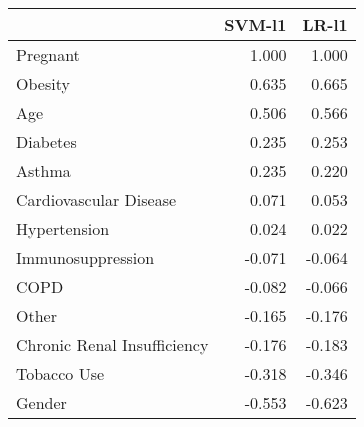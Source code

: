 \begin{tabular}{lrr}
\toprule
{} &  SVM-l1 &  LR-l1 \\
\midrule
Pregnant                    &   1.000 &  1.000 \\
Obesity                     &   0.635 &  0.665 \\
Age                         &   0.506 &  0.566 \\
Diabetes                    &   0.235 &  0.253 \\
Asthma                      &   0.235 &  0.220 \\
Cardiovascular Disease      &   0.071 &  0.053 \\
Hypertension                &   0.024 &  0.022 \\
Immunosuppression           &  -0.071 & -0.064 \\
COPD                        &  -0.082 & -0.066 \\
Other                       &  -0.165 & -0.176 \\
Chronic Renal Insufficiency &  -0.176 & -0.183 \\
Tobacco Use                 &  -0.318 & -0.346 \\
Gender                      &  -0.553 & -0.623 \\
\bottomrule
\end{tabular}
